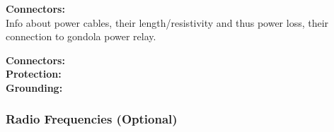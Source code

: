 \textbf{Connectors:}\\

%

Info about power cables, their length/resistivity and thus power loss, their connection to gondola power relay.



\textbf{Connectors:}\\

\textbf{Protection:}\\

\textbf{Grounding:}\\


\subsubsection{Radio Frequencies (Optional)}



\raggedbottom
